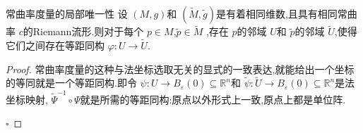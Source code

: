 \documentclass[../../main.tex]{subfiles}
\begin{document}
\begin{corollary}{常曲率度量的局部唯一性}
    设 \(  \left( M,g \right)   \)和 \(  \left( \tilde{M},\tilde{g} \right)   \)是有着相同维数,且具有相同常曲率 \(  c  \)的Riemann流形.则对于每个 \(  p \in M  \),\(  \tilde{p}\in \tilde{M}  \)     ,存在 \(  p  \)的邻域 \(  U  \)和 \(  \tilde{p}  \)的邻域 \(  \tilde{U}  \),使得它们之间存在等距同构 \(   \varphi : U\to \tilde{U}  \).     
\end{corollary}

\begin{proof}
    常曲率度量的这种与法坐标选取无关的显式的一致表达,就能给出一个坐标的等同就是一个等距同构.即令 \(  \psi :U\to B_{ \varepsilon }\left( 0 \right)\subseteq \mathbb{R} ^{n}   \)和 \(  \tilde{\psi} :\tilde{U}\to B_{ \varepsilon }\left( 0 \right)   \subseteq \mathbb{R} ^{n}\)是法坐标映射, \(  \tilde{\Psi} ^{-1} \circ \Psi   \)就是所需的等距同构:原点以外形式上一致,原点上都是单位阵.

    \hfill $\square$
\end{proof}
\end{document}
